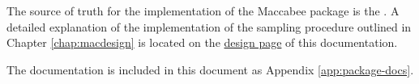 \documentclass[../main.tex]{subfiles}
\begin{document}
The source of truth for the implementation of the Maccabee package is the . A detailed explanation of the implementation of the sampling procedure outlined in Chapter \ref{chap:macdesign} is located on the \href{\RTDurl/en/latest/design.html}{design page} of this documentation.

\vspace{\baselineskip}

The documentation is included in this document as Appendix \ref{app:package-docs}.
\end{document}

